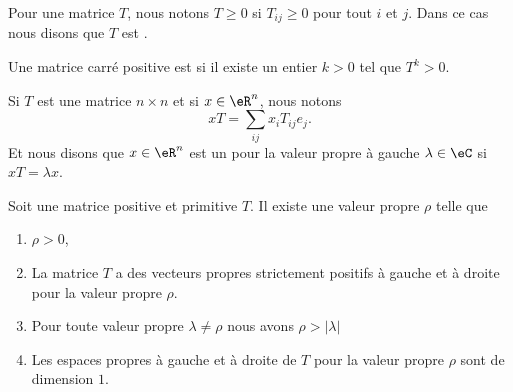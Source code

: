 \begin{definition}
    Pour une matrice \( T\), nous notons \( T\geq 0\) si \( T_{ij}\geq 0\) pour tout \( i\) et \( j\). Dans ce cas nous disons que \( T\) est .

    Une matrice carré positive est  si il existe un entier \( k>0\) tel que \( T^k>0\).
\end{definition}

\begin{definition}      \label{DEFooRFQCooQrLPVw}
    Si \( T\) est une matrice \( n\times n\) et si \( x\in \eR^n\), nous notons
    \begin{equation}
        xT=\sum_{ij}x_iT_{ij}e_j.
    \end{equation}
    Et nous disons que \( x\in \eR^n\) est un  pour la valeur propre à gauche \( \lambda\in \eC\) si \( xT=\lambda x\).
\end{definition}

\begin{theorem}
    Soit une matrice positive et primitive \( T\). Il existe une valeur propre \( \rho\) telle que
    \begin{enumerate}
        \item
            \( \rho>0\),
        \item
            La matrice \( T\) a des vecteurs propres strictement positifs à gauche et à droite pour la valeur propre \( \rho\).
        \item
            Pour toute valeur propre \( \lambda\neq \rho\) nous avons \( \rho>| \lambda |\)
        \item
            Les espaces propres à gauche et à droite de \( T\) pour la valeur propre \( \rho\) sont de dimension \( 1\).
    \end{enumerate}
\end{theorem}

